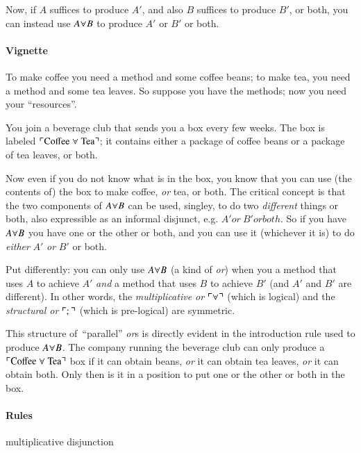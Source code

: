\documentclass{article}
\begin{document}
Now, if \(A\) suffices to produce \(A'\), and also \(B\) suffices to
produce \(B'\), or both, you can instead use \(A\fission B\) to produce
\(A'\) or \(B'\) or both.

\paragraph{Vignette\\}

To make coffee you need a method and some coffee beans; to make tea,
you need a method and some tea leaves. So suppose you have the
methods; now you need your ``resources''.

You join a beverage club that sends you a box every few weeks. The
box is labeled
\(\ulcorner\text{Coffee}\ \fission\ \text{Tea}\urcorner\); it contains
either a package of coffee beans or a package of tea leaves, or both.

Now even if you do not know what is in the box, you know that you can
use (the contents of) the box to make coffee, \textit{or} tea, or
both. The critical concept is that the two components of \(A\fission
B\) can be used, singley, to do two \textit{different} things or both,
also expressible as an informal disjunct, e.g. \(A' \textit{or}\ B'
\textit{or} both\). So if you have \(A\fission B\) you have one or the
other or both, and you can use it (whichever it is) to do \textit{either}
\(A'\) \textit{or} \(B'\) or both.

Put differently: you can only use \(A\fission B\) (a kind of
\textit{or}) when you a method that uses \(A\) to achieve \(A'\)
\textit{and} a method that uses \(B\) to achieve \(B'\) (and \(A'\)
and \(B'\) are different). In other words, the \textit{multiplicative
  or} \(\ulcorner\fission\urcorner\) (which is logical) and the
\textit{structural or} \(\ulcorner\structor\urcorner\) (which is
pre-logical) are symmetric.

This structure of\ \enquote{parallel} \textit{or}s is directly evident in the
introduction rule used to produce \(A\fission B\). The company running
the beverage club can only produce a
\(\ulcorner\text{Coffee}\ \fission\ \text{Tea}\urcorner\) box if it can
obtain beans, \textit{or} it can obtain tea leaves, \textit{or} it can
obtain both. Only then is it in a position to put one or the other
or both in the box.

\paragraph{Rules} multiplicative disjunction
\end{document}

